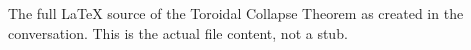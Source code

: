The full LaTeX source of the Toroidal Collapse Theorem as created in the conversation. This is the actual file content, not a stub.